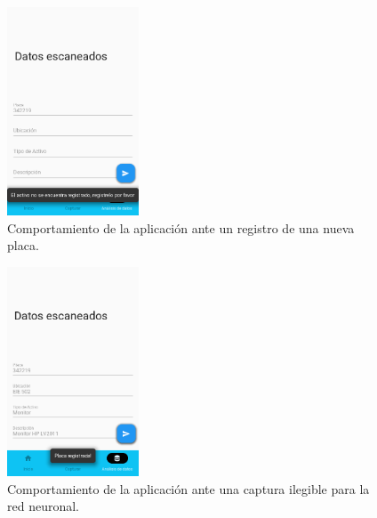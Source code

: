 \begin{figure}[ht]
    \centering
    \includegraphics[width=0.35\textwidth]{imagenes/resultados/cinco.png}
    \caption{Comportamiento de la aplicación ante un registro de una nueva placa.}
    \label{r:cinco}
\end{figure}
\begin{figure}[ht]
    \centering
    \includegraphics[width=0.35\textwidth]{imagenes/resultados/seis.png}
    \caption{Comportamiento de la aplicación ante una captura ilegible para la red neuronal.}
    \label{r:seis}
\end{figure}